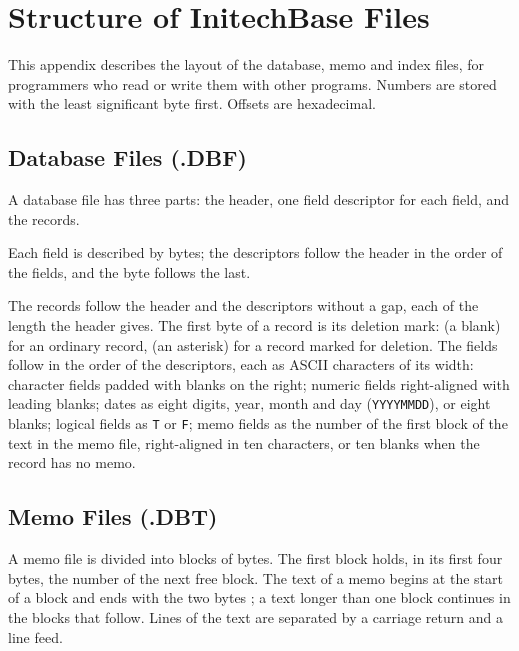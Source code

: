\chapter{Structure of InitechBase Files}
\NoDictionaryHeads
{}
This appendix describes the layout of the database, memo and index files, for
programmers who read or write them with other programs.  Numbers are stored
with the least significant byte first.  Offsets are hexadecimal.

\section{Database Files (.DBF)}
A database file has three parts: the header, one field descriptor for each
field, and the records.


Each field is described by \FormatDBFRecordBytes{} bytes; the descriptors
follow the header in the order of the fields, and the byte \FormatDBFTerminator{}
follows the last.

The records follow the header and the descriptors without a gap, each of the
length the header gives.  The first byte of a record is its deletion mark:
\FormatDBFLive{} (a blank) for an ordinary record, \FormatDBFDeleted{} (an
asterisk) for a record marked for deletion.  The fields follow in the order
of the descriptors, each as ASCII characters of its width: character fields
padded with blanks on the right; numeric fields right-aligned with leading
blanks; dates as eight digits, year, month and day (\texttt{YYYYMMDD}), or eight
blanks; logical fields as \texttt{T} or \texttt{F}; memo fields as the number
of the first block of the text in the memo file, right-aligned in ten
characters, or ten blanks when the record has no memo.

\section{Memo Files (.DBT)}
A memo file is divided into blocks of \FormatDBTBlock{} bytes.  The first block
holds, in its first four bytes, the number of the next free block.  The text
of a memo begins at the start of a block and ends with the two bytes
\FormatDBTTerm{}; a text longer than one block continues in the blocks that
follow.  Lines of the text are separated by a carriage return and a line feed.

